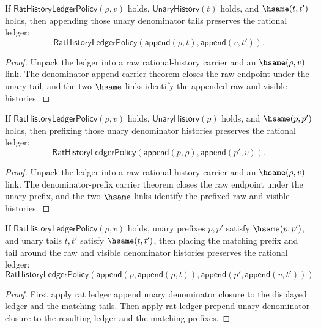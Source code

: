 \begin{theorem}
\label{thm:rat-ledger-append-unary-denominator-closed}
If $\mathsf{RatHistoryLedgerPolicy}(\rho,v)$ holds, $\mathsf{UnaryHistory}(t)$
holds, and $\hsame(t,t')$ holds, then appending those unary denominator tails
preserves the rational ledger:
$$
\mathsf{RatHistoryLedgerPolicy}(\mathsf{append}(\rho,t),\mathsf{append}(v,t')).
$$
\end{theorem}
\begin{proof}
Unpack the ledger into a raw rational-history carrier and an $\hsame(\rho,v)$
link. The denominator-append carrier theorem closes the raw endpoint under the
unary tail, and the two $\hsame$ links identify the appended raw and visible
histories.
\end{proof}

\begin{theorem}
\label{thm:rat-ledger-prepend-unary-denominator-closed}
If $\mathsf{RatHistoryLedgerPolicy}(\rho,v)$ holds,
$\mathsf{UnaryHistory}(p)$ holds, and $\hsame(p,p')$ holds, then prefixing
those unary denominator histories preserves the rational ledger:
$$
\mathsf{RatHistoryLedgerPolicy}(\mathsf{append}(p,\rho),\mathsf{append}(p',v)).
$$
\end{theorem}
\begin{proof}
Unpack the ledger into a raw rational-history carrier and an $\hsame(\rho,v)$
link. The denominator-prefix carrier theorem closes the raw endpoint under the
unary prefix, and the two $\hsame$ links identify the prefixed raw and visible
histories.
\end{proof}

\begin{theorem}
\label{thm:rat-ledger-unary-denominator-context-closed}
If $\mathsf{RatHistoryLedgerPolicy}(\rho,v)$ holds, unary prefixes $p,p'$
satisfy $\hsame(p,p')$, and unary tails $t,t'$ satisfy $\hsame(t,t')$, then
placing the matching prefix and tail around the raw and visible denominator
histories preserves the rational ledger:
$$
\mathsf{RatHistoryLedgerPolicy}(\mathsf{append}(p,\mathsf{append}(\rho,t)),
\mathsf{append}(p',\mathsf{append}(v,t'))).
$$
\end{theorem}
\begin{proof}
First apply rat ledger append unary denominator closure to the displayed ledger
and the matching tails. Then apply rat ledger prepend unary denominator closure
to the resulting ledger and the matching prefixes.
\end{proof}


